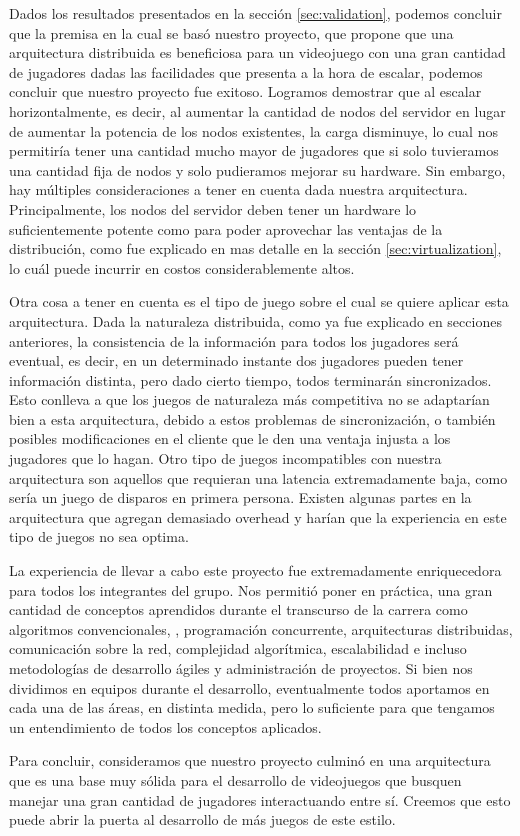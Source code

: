
Dados los resultados presentados en la sección \ref{sec:validation}, podemos concluir que la premisa
en la cual se basó nuestro proyecto, que propone que una arquitectura distribuida es beneficiosa para un
videojuego con una gran cantidad de jugadores dadas las facilidades que presenta a la hora de escalar,
podemos concluir que nuestro proyecto fue exitoso. Logramos demostrar que al escalar horizontalmente,
es decir, al aumentar la cantidad de nodos del servidor en lugar de aumentar la potencia de los nodos existentes,
la carga disminuye, lo cual nos permitiría tener una cantidad mucho mayor de jugadores que si solo tuvieramos
una cantidad fija de nodos y solo pudieramos mejorar su hardware.
Sin embargo, hay múltiples consideraciones a tener en cuenta dada nuestra arquitectura. Principalmente, los nodos
del servidor deben tener un hardware lo suficientemente potente como para poder aprovechar las ventajas de la
distribución, como fue explicado en mas detalle en la sección \ref{sec:virtualization}, lo cuál puede incurrir en 
costos considerablemente altos.

Otra cosa a tener en cuenta es el tipo de juego sobre el cual se quiere aplicar esta arquitectura. Dada la naturaleza
distribuida, como ya fue explicado en secciones anteriores, la consistencia de la información para todos los jugadores
será eventual, es decir, en un determinado instante dos jugadores pueden tener información distinta, pero dado cierto tiempo,
todos terminarán sincronizados. Esto conlleva a que los juegos de naturaleza más competitiva no se adaptarían bien a esta
arquitectura, debido a estos problemas de sincronización, o también posibles modificaciones en el cliente que le den una ventaja
injusta a los jugadores que lo hagan.
Otro tipo de juegos incompatibles con nuestra arquitectura son aquellos que requieran una latencia extremadamente baja, como sería
un juego de disparos en primera persona. Existen algunas partes en la arquitectura que agregan demasiado overhead y harían que la
experiencia en este tipo de juegos no sea optima.

La experiencia de llevar a cabo este proyecto fue extremadamente enriquecedora para todos los integrantes del grupo.
Nos permitió poner en práctica, una gran cantidad de conceptos aprendidos durante el transcurso de la carrera como algoritmos convencionales,
, programación concurrente, arquitecturas distribuidas, comunicación sobre la red, complejidad algorítmica, escalabilidad e incluso metodologías
de desarrollo ágiles y administración de proyectos. Si bien nos dividimos en equipos durante el desarrollo, eventualmente todos aportamos
en cada una de las áreas, en distinta medida, pero lo suficiente para que tengamos un entendimiento de todos los conceptos aplicados.

Para concluir, consideramos que nuestro proyecto culminó en una arquitectura que es una base muy sólida para el desarrollo de videojuegos
que busquen manejar una gran cantidad de jugadores interactuando entre sí. Creemos que esto puede abrir la puerta al desarrollo de más juegos
de este estilo.
